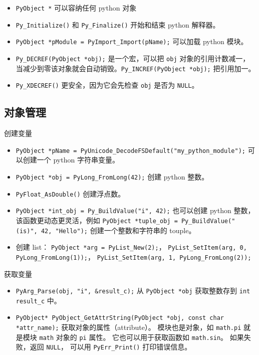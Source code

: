 

\begin{itemize}
\item \verb`PyObject *` 可以容纳任何 python 对象
\item \verb`Py_Initialize()` 和 \verb`Py_Finalize()` 开始和结束 python 解释器。
\item \verb`PyObject *pModule = PyImport_Import(pName);` 可以加载 python 模块。
\item \verb`Py_DECREF(PyObject *obj);` 是一个宏，可以把 \verb`obj` 对象的引用计数减一， 当减少到零该对象就会自动销毁。\verb`Py_INCREF(PyObject *obj);` 把引用加一。
\item \verb`Py_XDECREF()` 更安全，因为它会先检查 \verb`obj` 是否为 \verb`NULL`。
\end{itemize}

\subsection{对象管理}
创建变量
\begin{itemize}
\item \verb`PyObject *pName = PyUnicode_DecodeFSDefault("my_python_module");` 可以创建一个 python 字符串变量。
\item \verb`PyObject *obj = PyLong_FromLong(42);` 创建 python 整数。
\item \verb`PyFloat_AsDouble()` 创建浮点数。
\item \verb`PyObject *int_obj = Py_BuildValue("i", 42);` 也可以创建 python 整数，该函数更动态更灵活，例如 \verb`PyObject *tuple_obj = Py_BuildValue("(is)", 42, "Hello");` 创建一个整数和字符串的 touple。
\item 创建 list： \verb`PyObject *arg = PyList_New(2);`， \verb`PyList_SetItem(arg, 0, PyLong_FromLong(1));`， \verb`PyList_SetItem(arg, 1, PyLong_FromLong(2));`
\end{itemize}

获取变量
\begin{itemize}
\item \verb`PyArg_Parse(obj, "i", &result_c);` 从 \verb`PyObject *obj` 获取整数存到 \verb`int result_c` 中。
\item \verb`PyObject* PyObject_GetAttrString(PyObject *obj, const char *attr_name);` 获取对象的属性（attribute）。 模块也是对象，如 \verb`math.pi` 就是模块 \verb`math` 对象的 \verb`pi` 属性。 它也可以用于获取函数如 \verb`math.sin`。 如果失败，返回 \verb`NULL`， 可以用 \verb`PyErr_Print()` 打印错误信息。
\end{itemize}

